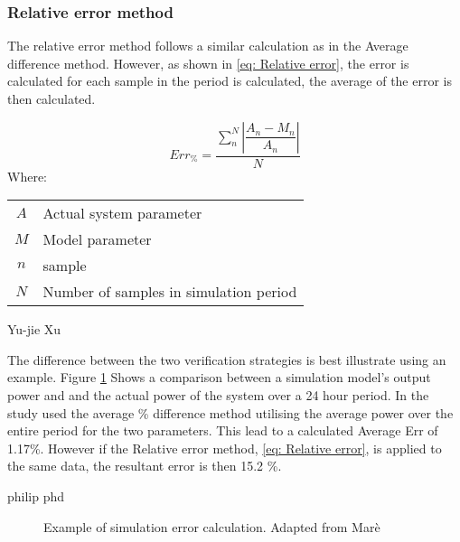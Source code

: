  		\subsubsection{Relative error method}
 		The relative error method follows a similar calculation as in the Average difference method. However, as shown in \cref{eq: Relative error}, the error is calculated for each sample in the period is calculated, the average of the error is then calculated.
 			
 			\begin{equation}
 			\label{eq: Relative error}
 			Err_{\%} = \dfrac{\sum_{n}^{N}{\left|\dfrac{A_{n} - M_{n}}{A_{n}}\right| }}{N}
 			\end{equation}
 			Where: 
 			\begin{table}[h!]
 				\centering
 				\begin{tabular}{cl}
 					$A$ & Actual system parameter \\
 					$M$ & Model parameter \\
 					$n$ & sample \\
 					$N$ & Number of samples in simulation period \\
 				\end{tabular} 
 			\end{table}	
 		Yu-jie Xu \cite{xu2016modeling}
 		\par 
 		The difference between the two verification strategies is best illustrate using an example. Figure \cref{fig:Philipp Diffeence verify} Shows a comparison between a simulation model's output power and and the actual power of the system over a 24 hour period. In the study \cite{Mare2016PhD} used the average \% difference method utilising the average power over the entire period for the two parameters. This lead to a calculated Average Err of 1.17\%. However if the Relative error method, \cref{eq: Relative error}, is applied to the same data, the resultant error is then 15.2 \%. 
 		
 		philip phd \cite{Mare2016PhD}
 		
 	\begin{figure}[h!]
 		\centering
 		
 		\caption[Example of simulation error calculation.]{Example of simulation error calculation. Adapted from Marè \cite{Mare2016PhD}}
 		\label{fig:Philipp Diffeence verify}
 	\end{figure}
 

